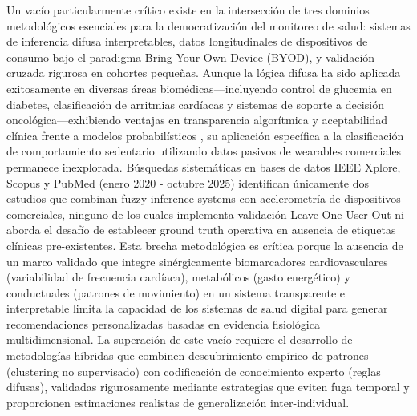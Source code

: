 Un vacío particularmente crítico existe en la intersección de tres dominios metodológicos esenciales para la democratización del monitoreo de salud: sistemas de inferencia difusa interpretables, datos longitudinales de dispositivos de consumo bajo el paradigma Bring-Your-Own-Device (BYOD), y validación cruzada rigurosa en cohortes pequeñas. Aunque la lógica difusa ha sido aplicada exitosamente en diversas áreas biomédicas—incluyendo control de glucemia en diabetes, clasificación de arritmias cardíacas y sistemas de soporte a decisión oncológica—exhibiendo ventajas en transparencia algorítmica y aceptabilidad clínica frente a modelos probabilísticos \cite{Kaur2022,Seoni2023,Nambison2024}, su aplicación específica a la clasificación de comportamiento sedentario utilizando datos pasivos de wearables comerciales permanece inexplorada. Búsquedas sistemáticas en bases de datos IEEE Xplore, Scopus y PubMed (enero 2020 - octubre 2025) identifican únicamente dos estudios que combinan fuzzy inference systems con acelerometría de dispositivos comerciales, ninguno de los cuales implementa validación Leave-One-User-Out ni aborda el desafío de establecer ground truth operativa en ausencia de etiquetas clínicas pre-existentes. Esta brecha metodológica es crítica porque la ausencia de un marco validado que integre sinérgicamente biomarcadores cardiovasculares (variabilidad de frecuencia cardíaca), metabólicos (gasto energético) y conductuales (patrones de movimiento) en un sistema transparente e interpretable limita la capacidad de los sistemas de salud digital para generar recomendaciones personalizadas basadas en evidencia fisiológica multidimensional. La superación de este vacío requiere el desarrollo de metodologías híbridas que combinen descubrimiento empírico de patrones (clustering no supervisado) con codificación de conocimiento experto (reglas difusas), validadas rigurosamente mediante estrategias que eviten fuga temporal y proporcionen estimaciones realistas de generalización inter-individual.


